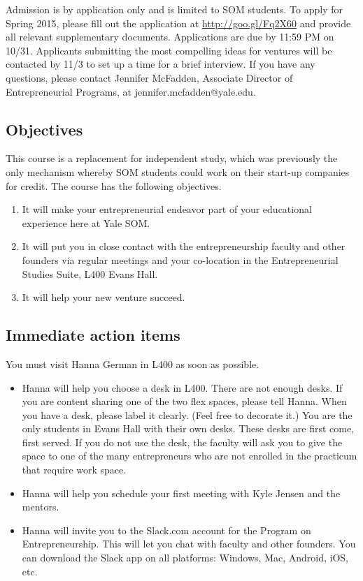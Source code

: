 Admission is by application only and is limited to SOM students. To apply for Spring 2015, please fill out the application at \url{http://goo.gl/Fq2X60} and provide all relevant supplementary
 documents. Applications are due by 11:59 PM on 10/31. Applicants submitting the most compelling ideas for ventures will be contacted by 11/3 to set up a time for a brief interview. If you have any questions, please contact Jennifer McFadden, Associate Director
 of Entrepreneurial Programs, at jennifer.mcfadden@yale.edu. 

\subsection*{Objectives}
This course is a replacement for independent study, which was previously the only mechanism
whereby SOM students could work on their start-up companies for credit. The course has the
following objectives.
\begin{enumerate}
	\item
		It will make your entrepreneurial endeavor part of your
		educational experience here at Yale SOM.
	\item
		It will put you in close contact with the entrepreneurship
		faculty and other founders via regular meetings and your
		co-location in the Entrepreneurial Studies Suite, L400 Evans Hall.
	\item
		It will help your new venture succeed.
\end{enumerate}

\subsection*{Immediate action items}
You must visit Hanna German in L400 as soon as possible.

\begin{itemize}
	
		\item
		Hanna will help you choose a desk in L400. There are not enough
		desks. If you are content sharing one of the two flex spaces,
		please tell Hanna. When you have a desk, please label it
		clearly. (Feel free to decorate it.) You are the only students
		in Evans Hall with their own desks. These desks are first come, first
		served. If you do not use the desk, the faculty will ask you to give
		the space to one of the many entrepreneurs who are not enrolled in the
		practicum that require work space.
	\item
		Hanna will help you schedule your first meeting with Kyle Jensen and the mentors.

	\item Hanna will invite you to the Slack.com account for the Program on Entrepreneurship.
		This will let you 
		chat with faculty and other founders. You can download the Slack app
		on all platforms: Windows, Mac, Android, iOS, etc.
\end{itemize}


